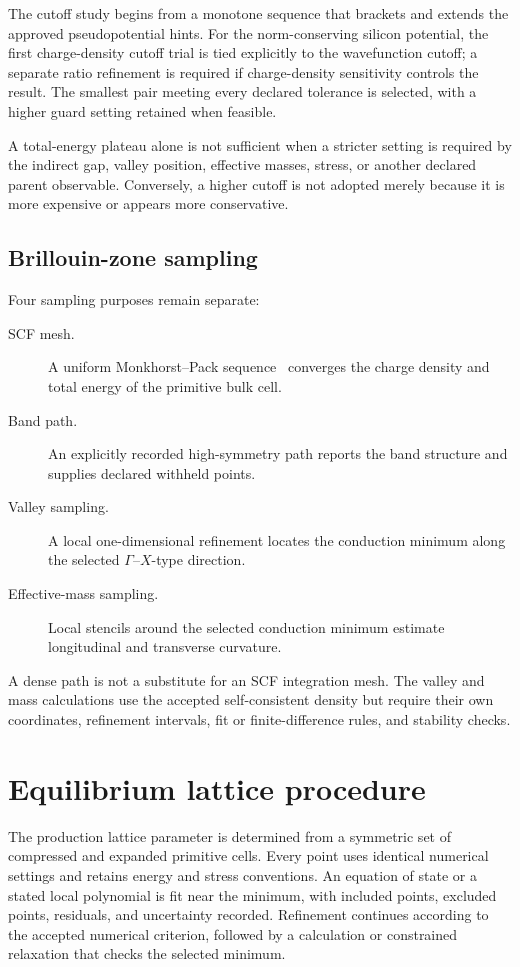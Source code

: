 The cutoff study begins from a monotone sequence that brackets and extends the
approved pseudopotential hints. For the norm-conserving silicon potential, the
first charge-density cutoff trial is tied explicitly to the wavefunction cutoff;
a separate ratio refinement is required if charge-density sensitivity controls
the result. The smallest pair meeting every declared tolerance is selected,
with a higher guard setting retained when feasible.

A total-energy plateau alone is not sufficient when a stricter setting is
required by the indirect gap, valley position, effective masses, stress, or
another declared parent observable. Conversely, a higher cutoff is not adopted
merely because it is more expensive or appears more conservative.

\subsection{Brillouin-zone sampling}

Four sampling purposes remain separate:

\begin{description}
  \item[SCF mesh.] A uniform Monkhorst--Pack sequence~\cite{monkhorst1976}
    converges the charge density and total energy of the primitive bulk cell.
  \item[Band path.] An explicitly recorded high-symmetry path reports the band
    structure and supplies declared withheld points.
  \item[Valley sampling.] A local one-dimensional refinement locates the
    conduction minimum along the selected $\Gamma$--$X$-type direction.
  \item[Effective-mass sampling.] Local stencils around the selected conduction
    minimum estimate longitudinal and transverse curvature.
\end{description}

A dense path is not a substitute for an SCF integration mesh. The valley and
mass calculations use the accepted self-consistent density but require their
own coordinates, refinement intervals, fit or finite-difference rules, and
stability checks.

\section{Equilibrium lattice procedure}

The production lattice parameter is determined from a symmetric set of
compressed and expanded primitive cells. Every point uses identical numerical
settings and retains energy and stress conventions. An equation of state or a
stated local polynomial is fit near the minimum, with included points, excluded
points, residuals, and uncertainty recorded. Refinement continues according to
the accepted numerical criterion, followed by a calculation or constrained
relaxation that checks the selected minimum.

